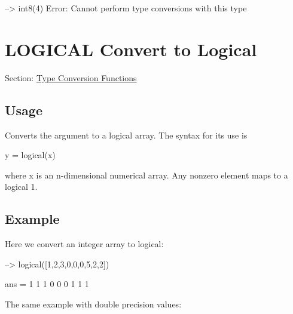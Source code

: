 \begin{DoxyVerbInclude}
--> int8({4})
Error: Cannot perform type conversions with this type
\end{DoxyVerbInclude}
 \hypertarget{typecast_logical}{}\section{L\-O\-G\-I\-C\-A\-L Convert to Logical}\label{typecast_logical}
Section\-: \hyperlink{sec_typecast}{Type Conversion Functions} \hypertarget{vtkwidgets_vtkxyplotwidget_Usage}{}\subsection{Usage}\label{vtkwidgets_vtkxyplotwidget_Usage}
Converts the argument to a logical array. The syntax for its use is \begin{DoxyVerb}   y = logical(x)
\end{DoxyVerb}
 where {\ttfamily x} is an {\ttfamily n}-\/dimensional numerical array. Any nonzero element maps to a logical 1. \hypertarget{variables_struct_Example}{}\subsection{Example}\label{variables_struct_Example}
Here we convert an integer array to {\ttfamily logical}\-:


\begin{DoxyVerbInclude}
--> logical([1,2,3,0,0,0,5,2,2])

ans = 
 1 1 1 0 0 0 1 1 1 
\end{DoxyVerbInclude}


The same example with double precision values\-:


